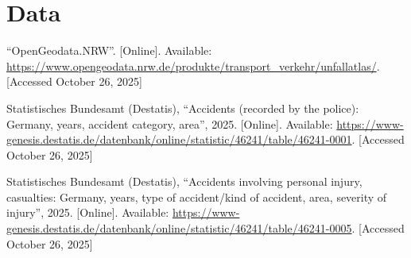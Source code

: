 \documentclass[10pt,a4paper]{article} %
\begin{document}
\section*{Data}
\begin{enumerate}[label={[\arabic*]},start=4]
    \item ``OpenGeodata.NRW''. [Online]. Available: \url{https://www.opengeodata.nrw.de/produkte/transport_verkehr/unfallatlas/}. [Accessed October 26, 2025]
    \item Statistisches Bundesamt (Destatis), ``Accidents (recorded by the police): Germany, years, accident category, area'', 2025. [Online]. Available: \url{https://www-genesis.destatis.de/datenbank/online/statistic/46241/table/46241-0001}. [Accessed October 26, 2025] %
    \item Statistisches Bundesamt (Destatis), ``Accidents involving personal injury, casualties: Germany, years, type of accident/kind of accident, area, severity of injury'', 2025. [Online]. Available: \url{https://www-genesis.destatis.de/datenbank/online/statistic/46241/table/46241-0005}. [Accessed October 26, 2025] %
\end{enumerate}

\end{document}
